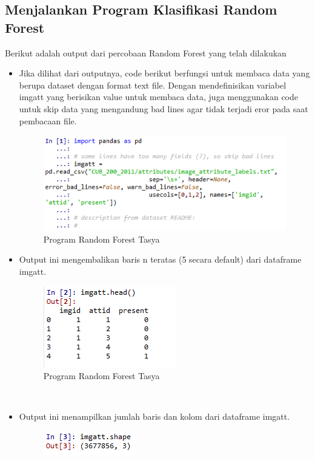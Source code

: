 \subsection{Menjalankan Program Klasifikasi Random Forest}
Berikut adalah output dari percobaan Random Forest yang telah dilakukan
\begin{itemize}
\item Jika dilihat dari outputnya, code berikut berfungsi untuk membaca data yang berupa dataset dengan format text file. Dengan mendefinisikan variabel imgatt yang berisikan value untuk membaca data, juga menggunakan code untuk skip data yang mengandung bad lines agar tidak terjadi eror pada saat pembacaan file.
\begin{figure}[ht]
\centering
\includegraphics[scale=0.5]{figures/rf1.png}\newpage
\caption{Program Random Forest Tasya}
\label{Praktek}
\end{figure}
\item Output ini mengembalikan baris n teratas (5 secara default) dari dataframe imgatt.
\begin{figure}[ht]
\centering
\includegraphics[scale=0.5]{figures/rf2.png}
\caption{Program Random Forest Tasya}
\label{Praktek}
\end{figure}
\\
\item Output ini menampilkan jumlah baris dan kolom dari dataframe imgatt.
\begin{figure}[ht]
\centering
\includegraphics[scale=0.5]{figures/rf3.png}

\end{figure}
\end{itemize}
